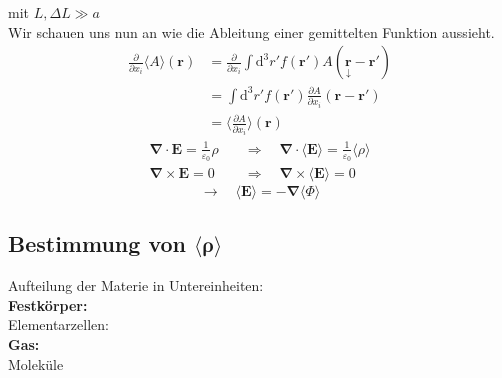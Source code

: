 \documentclass[titlepage,11pt,a4paper,ngerman]{report}
\newcommand{\tx}[1]{\textrm{#1}}
\newcommand{\dd}{\tx{d}}
\newcommand{\prt}[2]{\frac{\partial #1}{\partial #2}}
\renewcommand{\Phi}{\varPhi}
\renewcommand{\vec}[1]{\boldsymbol{#1}}
\renewcommand{\epsilon}{\varepsilon}
\newcommand{\vabla}{\boldsymbol{\nabla}}
\begin{document}

mit $ L, \Delta L \gg a $\\
Wir schauen uns nun an wie die Ableitung einer gemittelten Funktion aussieht.
\begin{align*}
\prt{}{x_i} \langle A \rangle (\vec{r}) &= \prt{}{x_i} \int \dd ^3 r' f(\vec{r}') A(\underset{\downarrow}{\vec{r}} - \vec{r}') \\
&= \int \dd ^3 r' f(\vec{r}') \prt{A}{x_i} (\vec{r} - \vec{r}') \\
&= \langle \prt{A}{x_i} \rangle (\vec{r})
\end{align*}
\begin{align*}
\vabla \cdot \vec{E} = \frac{1}{\epsilon_0} \rho \quad &\Rightarrow \quad \vabla \cdot \langle \vec{E} \rangle = \frac{1}{\epsilon_0} \langle \rho \rangle \\
\vabla \times \vec{E} = 0 \quad &\Rightarrow \quad \vabla \times \langle \vec{E} \rangle = 0
\end{align*}
\begin{equation*}
\rightarrow \quad \langle \vec{E} \rangle = - \vabla \langle \Phi \rangle
\end{equation*}

\subsection{Bestimmung von $ \boldsymbol{ \langle \rho \rangle } $}

Aufteilung der Materie in Untereinheiten:\\
\textbf{Festkörper:}\\
Elementarzellen:\\


\textbf{Gas:}\\
Moleküle\\

\end{document}
